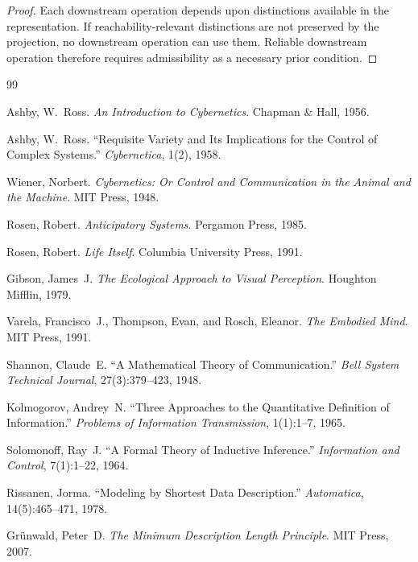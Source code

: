 \documentclass[12pt,a4paper]{article}
\theoremstyle{plain}
\theoremstyle{definition}
\theoremstyle{remark}
\begin{document}
\begin{proof}
Each downstream operation depends upon distinctions available in the
representation. If reachability-relevant distinctions are not preserved by
the projection, no downstream operation can use them. Reliable downstream
operation therefore requires admissibility as a necessary prior condition.
\end{proof}

\bigskip

\begin{thebibliography}{99}

Ashby, W.~Ross.
\textit{An Introduction to Cybernetics}.
Chapman \& Hall, 1956.

Ashby, W.~Ross.
``Requisite Variety and Its Implications for the Control of Complex Systems.''
\textit{Cybernetica}, 1(2), 1958.

Wiener, Norbert.
\textit{Cybernetics: Or Control and Communication in the Animal and the
Machine}.
MIT Press, 1948.

Rosen, Robert.
\textit{Anticipatory Systems}.
Pergamon Press, 1985.

Rosen, Robert.
\textit{Life Itself}.
Columbia University Press, 1991.

Gibson, James~J.
\textit{The Ecological Approach to Visual Perception}.
Houghton Mifflin, 1979.

Varela, Francisco~J., Thompson, Evan, and Rosch, Eleanor.
\textit{The Embodied Mind}.
MIT Press, 1991.

Shannon, Claude~E.
``A Mathematical Theory of Communication.''
\textit{Bell System Technical Journal}, 27(3):379--423, 1948.

Kolmogorov, Andrey~N.
``Three Approaches to the Quantitative Definition of Information.''
\textit{Problems of Information Transmission}, 1(1):1--7, 1965.

Solomonoff, Ray~J.
``A Formal Theory of Inductive Inference.''
\textit{Information and Control}, 7(1):1--22, 1964.

Rissanen, Jorma.
``Modeling by Shortest Data Description.''
\textit{Automatica}, 14(5):465--471, 1978.

Gr\"{u}nwald, Peter~D.
\textit{The Minimum Description Length Principle}.
MIT Press, 2007.


\end{thebibliography}
\end{document}

